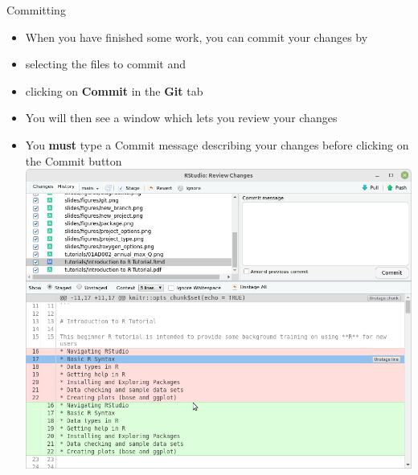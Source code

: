 \documentclass[
  ignorenonframetext,
  aspectratio=169]{beamer}
\providecommand{\tightlist}{%
  \setlength{\itemsep}{0pt}\setlength{\parskip}{0pt}}
\begin{document}
\begin{frame}{Committing}
\protect\hypertarget{committing}{}
\begin{itemize}
\tightlist
\item
  When you have finished some work, you can commit your changes by
\item
  selecting the files to commit and
\item
  clicking on \textbf{Commit} in the \textbf{Git} tab
\item
  You will then see a window which lets you review your changes
\item
  You \textbf{must} type a Commit message describing your changes before
  clicking on the Commit button \includegraphics{figures/commit.png}
\end{itemize}
\end{frame}
\end{document}
